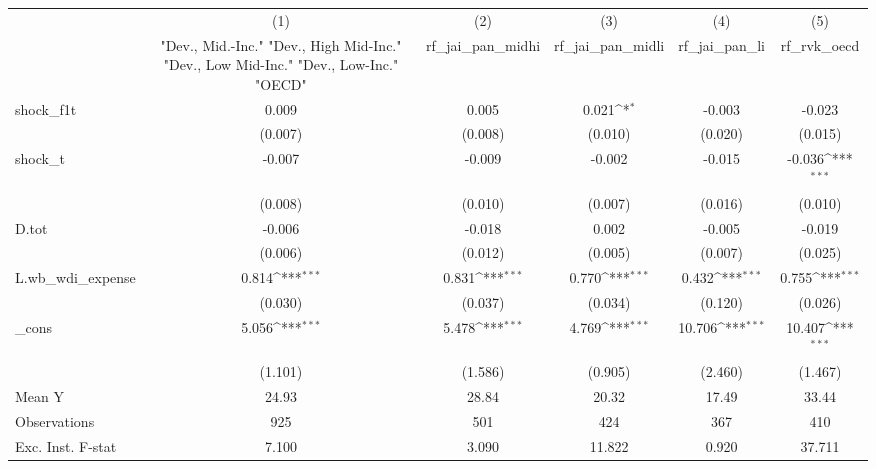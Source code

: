 {
\def\sym#1{\ifmmode^{#1}\else\(^{#1}\)\fi}
\begin{tabular}{l*{5}{c}}
\toprule
            &\multicolumn{1}{c}{(1)}&\multicolumn{1}{c}{(2)}&\multicolumn{1}{c}{(3)}&\multicolumn{1}{c}{(4)}&\multicolumn{1}{c}{(5)}\\
            &\multicolumn{1}{c}{ "Dev., Mid.-Inc." "Dev., High Mid-Inc." "Dev., Low Mid-Inc." "Dev., Low-Inc." "OECD" }&\multicolumn{1}{c}{rf\_jai\_pan\_midhi}&\multicolumn{1}{c}{rf\_jai\_pan\_midli}&\multicolumn{1}{c}{rf\_jai\_pan\_li}&\multicolumn{1}{c}{rf\_rvk\_oecd}\\
\midrule
shock\_f1t   &       0.009         &       0.005         &       0.021\sym{*}  &      -0.003         &      -0.023         \\
            &     (0.007)         &     (0.008)         &     (0.010)         &     (0.020)         &     (0.015)         \\
\addlinespace
shock\_t     &      -0.007         &      -0.009         &      -0.002         &      -0.015         &      -0.036\sym{***}\\
            &     (0.008)         &     (0.010)         &     (0.007)         &     (0.016)         &     (0.010)         \\
\addlinespace
D.tot       &      -0.006         &      -0.018         &       0.002         &      -0.005         &      -0.019         \\
            &     (0.006)         &     (0.012)         &     (0.005)         &     (0.007)         &     (0.025)         \\
\addlinespace
L.wb\_wdi\_expense&       0.814\sym{***}&       0.831\sym{***}&       0.770\sym{***}&       0.432\sym{***}&       0.755\sym{***}\\
            &     (0.030)         &     (0.037)         &     (0.034)         &     (0.120)         &     (0.026)         \\
\addlinespace
\_cons      &       5.056\sym{***}&       5.478\sym{***}&       4.769\sym{***}&      10.706\sym{***}&      10.407\sym{***}\\
            &     (1.101)         &     (1.586)         &     (0.905)         &     (2.460)         &     (1.467)         \\
\midrule
Mean Y      &       24.93         &       28.84         &       20.32         &       17.49         &       33.44         \\
Observations&         925         &         501         &         424         &         367         &         410         \\
Exc. Inst. F-stat&       7.100         &       3.090         &      11.822         &       0.920         &      37.711         \\
\bottomrule
\end{tabular}
}
